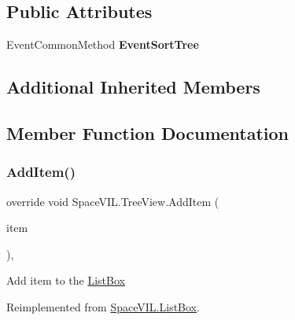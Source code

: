 \subsection*{Public Attributes}
\begin{DoxyCompactItemize}
\item 
\mbox{\label{class_space_v_i_l_1_1_tree_view_a1e348b398ac5e1d7cd1dd52b91f5eae7}} 
Event\+Common\+Method {\bfseries Event\+Sort\+Tree}
\end{DoxyCompactItemize}
\subsection*{Additional Inherited Members}


\subsection{Member Function Documentation}
\mbox{\label{class_space_v_i_l_1_1_tree_view_ab810906945c91dc1db571b446ea2f6a0}} 
\subsubsection{\texorpdfstring{Add\+Item()}{AddItem()}}
{\footnotesize\ttfamily override void Space\+V\+I\+L.\+Tree\+View.\+Add\+Item (\begin{DoxyParamCaption}\item[{\mbox{\hyperlink{interface_space_v_i_l_1_1_core_1_1_i_base_item}{I\+Base\+Item}}}]{item }\end{DoxyParamCaption})\hspace{0.3cm}{\ttfamily [inline]}, {\ttfamily [virtual]}}



Add item to the \mbox{\hyperlink{class_space_v_i_l_1_1_list_box}{List\+Box}} 



Reimplemented from \mbox{\hyperlink{class_space_v_i_l_1_1_list_box_a3650d9e40035bd0d22c30b475a0a90f0}{Space\+V\+I\+L.\+List\+Box}}.

\mbox{\label{class_space_v_i_l_1_1_tree_view_ac44a1df7d58a35e35842170162645e08}} 
